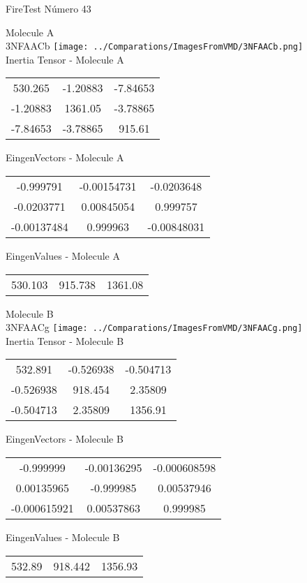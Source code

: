 \vtab[-2cm]
\begin{center}
{\large FireTest \tab Número 43}
\end{center}
\begin{multicols}{2}
\begin{center}

Molecule A \\ 
3NFAACb
\texttt{[image: ../Comparations/ImagesFromVMD/3NFAACb.png]}
\\
Inertia Tensor - Molecule A \\
\vtab

\begin{tabular}{|c c c|}
530.265	 & 	-1.20883	 & 	-7.84653	 \\
-1.20883	 & 	1361.05	 & 	-3.78865	 \\
-7.84653	 & 	-3.78865	 & 	915.61
\end{tabular}

\vtab
 EingenVectors - Molecule A     \\
\vtab
\begin{tabular}{|c c c|}
-0.999791	 & 	-0.00154731	 & 	-0.0203648	 \\
-0.0203771	 & 	0.00845054	 & 	0.999757	 \\
-0.00137484	 & 	0.999963	 & 	-0.00848031
\end{tabular}

\vtab
 EingenValues - Molecule A     \\
\vtab
\begin{tabular}{|c c c|}
530.103	 & 	915.738	 & 	1361.08	 \\
\end{tabular}
\columnbreak

Molecule B \\ 
3NFAACg
\texttt{[image: ../Comparations/ImagesFromVMD/3NFAACg.png]}
\\
Inertia Tensor - Molecule B \\
\vtab

\begin{tabular}{|c c c|}
532.891	 & 	-0.526938	 & 	-0.504713	 \\
-0.526938	 & 	918.454	 & 	2.35809	 \\
-0.504713	 & 	2.35809	 & 	1356.91
\end{tabular}

\vtab
 EingenVectors - Molecule B     \\
\vtab
\begin{tabular}{|c c c|}
-0.999999	 & 	-0.00136295	 & 	-0.000608598	 \\
0.00135965	 & 	-0.999985	 & 	0.00537946	 \\
-0.000615921	 & 	0.00537863	 & 	0.999985
\end{tabular}

\vtab
 EingenValues - Molecule B     \\
\vtab
\begin{tabular}{|c c c|}
532.89	 & 	918.442	 & 	1356.93	 \\
\end{tabular}

\end{center}
\end{multicols}
